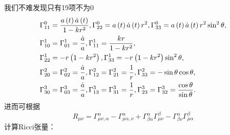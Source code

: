 \documentclass[../天体物理基础.tex]{subfiles}
\begin{document}
我们不难发现只有19项不为0
\begin{align}
\Gamma_{11}^{0}&=\frac{a\left(t\right)\dot{a}\left(t\right)}{1-kr^{2}},\Gamma_{22}^{0}=a\left(t\right)\dot{a}\left(t\right)r^{2},\Gamma_{33}^{0}=a\left(t\right)\dot{a}\left(t\right)r^{2}\sin^{2}\theta,\notag\\
\Gamma_{10}^{1}&=\Gamma_{01}^{1}=\frac{\dot a}{a},\Gamma_{11}^{1}=\frac{kr}{1-kr^{2}},\notag\\
\Gamma_{22}^{1}&=-r\left(1-kr^{2}\right),\Gamma_{33}^{1}=-r\left(1-kr^{2}\right)\sin^{2}\theta,\notag\\
\Gamma_{20}^{2}&=\Gamma_{02}^{2}=\frac{\dot a}{a},\Gamma_{12}^{2}=\Gamma_{21}^{2}=\frac{1}{r},\Gamma_{33}^{2}=-\sin\theta\cos\theta,\notag\\
\Gamma_{30}^{3}&=\Gamma_{03}^{3}=\frac{\dot a}{a},\Gamma_{13}^{3}=\Gamma_{31}^{3}=\frac{1}{r},\Gamma_{23}^{3}=\Gamma_{32}^{3}=\frac{\cos\theta}{\sin\theta}.\notag
\end{align}
进而可根据
\begin{equation}
R_{\mu\nu}=\Gamma_{\mu\nu,\alpha}^{\alpha}-\Gamma_{\mu\alpha,\nu}^{\alpha}+\Gamma_{\beta\alpha}^{\alpha}\Gamma_{\mu\nu}^{\beta}-\Gamma_{\beta\nu}^{\alpha}\Gamma_{\mu\alpha}^{\beta}
\end{equation}
计算Ricci张量：
\end{document}
